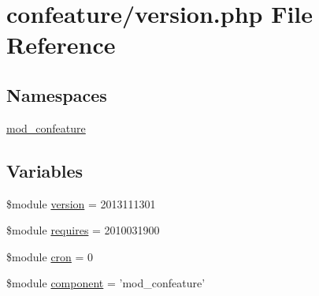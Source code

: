 \hypertarget{version_8php}{\section{confeature/version.php File Reference}
\label{version_8php}
}
\subsection*{Namespaces}
\begin{DoxyCompactItemize}
\item 
\hyperlink{namespacemod__confeature}{mod\-\_\-confeature}
\end{DoxyCompactItemize}
\subsection*{Variables}
\begin{DoxyCompactItemize}
\item 
\$module \hyperlink{version_8php_a1e2b2712a04f3a2db37b7057e4692a62}{version} = 2013111301
\item 
\$module \hyperlink{version_8php_a4c0ff460b6d47c1f7d1a74f2f5d74b9f}{requires} = 2010031900
\item 
\$module \hyperlink{version_8php_ac5478dfb9d76c36e604131b38740821a}{cron} = 0
\item 
\$module \hyperlink{version_8php_ac89a4ebe36a201f6c83db18ec8abbebd}{component} = 'mod\-\_\-confeature'
\end{DoxyCompactItemize}


